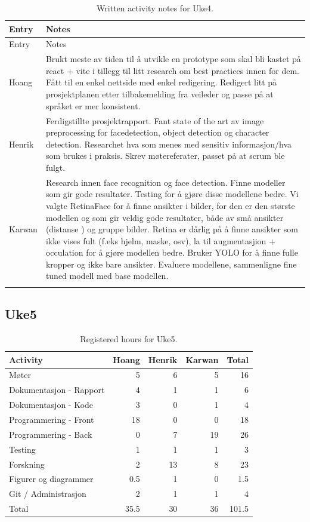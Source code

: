 \begin{longtable}{p{}p{}}
\caption{Written activity notes for Uke4.}\\
\toprule
Entry & Notes \\
\midrule
\endfirsthead
\toprule
Entry & Notes \\
\midrule
\endhead
Hoang & Brukt meste av tiden til å utvikle en prototype som skal bli kastet på react + vite i tillegg til litt research om best practices innen for dem. Fått til en enkel nettside med enkel redigering. Redigert litt på prosjektplanen etter tilbakemelding fra veileder og passe på at språket er mer konsistent. \\
\addlinespace
Henrik & Ferdigstillte prosjektrapport. Fant state of the art av image preprocessing for facedetection, object detection og character detection. Researchet hva som menes med sensitiv informasjon/hva som brukes i praksis. Skrev møtereferater, passet på at scrum ble fulgt. \\
\addlinespace
Karwan & Research innen face recognition og face detection. Finne modeller som gir gode resultater. Testing for å gjøre disse modellene bedre. Vi valgte RetinaFace for å finne ansikter i bilder, for den er den største modellen og som gir veldig gode resultater, både av små ansikter (distanse ) og gruppe bilder. Retina er dårlig på å finne ansikter som ikke vises fult (f.eks hjelm, maske, osv), la til augmentasjion + occulation for å gjøre modellen bedre. Bruker YOLO for å finne fulle kropper og ikke bare ansikter. Evaluere modellene, sammenligne fine tuned modell med base modellen. \\
\addlinespace
\bottomrule
\end{longtable}

\subsection{Uke5}

\begin{table}[H]
\centering
\small
\caption{Registered hours for Uke5.}
\label{tab:project-hours-uke5}
\begin{tabular}{lrrrr}
\toprule
Activity & Hoang & Henrik & Karwan & Total \\
\midrule
Møter & 5 & 6 & 5 & 16 \\
Dokumentasjon - Rapport & 4 & 1 & 1 & 6 \\
Dokumentasjon - Kode & 3 & 0 & 1 & 4 \\
Programmering - Front & 18 & 0 & 0 & 18 \\
Programmering - Back & 0 & 7 & 19 & 26 \\
Testing & 1 & 1 & 1 & 3 \\
Forskning & 2 & 13 & 8 & 23 \\
Figurer og diagrammer & 0.5 & 1 & 0 & 1.5 \\
Git / Administrasjon & 2 & 1 & 1 & 4 \\
\midrule
Total & 35.5 & 30 & 36 & 101.5 \\
\bottomrule
\end{tabular}
\end{table}

